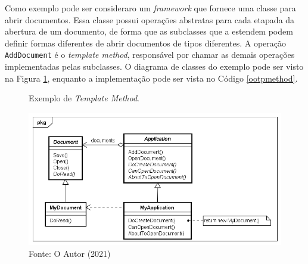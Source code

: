Como exemplo pode ser consideraro um \textit{framework} que 
fornece uma classe para abrir documentos. Essa classe 
possui operações abstratas para cada etapada da abertura 
de um documento, de forma que as subclasses que a estendem 
podem definir formas diferentes de abrir documentos de tipos 
diferentes. A operação \texttt{AddDocument} é o \textit{template method}, 
responsável por chamar as demais operações implementadas 
pelas subclasses. 
O diagrama de classes do exemplo pode ser visto na 
Figura \ref{tpmethod_exemplo}, 
enquanto a implementação pode ser vista no Código \ref{ootpmethod}.

\begin{figure}[htb]
	\caption{\label{tpmethod_exemplo}Exemplo de \textit{Template Method}.}
	\begin{center}
	    \includegraphics[scale=0.5]{5_padroes-contexto-funcional/5.3_comportamentais/5.3.10_template-method/templatemethod_exemplo.png}
	\end{center}
  \caption*{Fonte: O Autor (2021)}
\end{figure}

